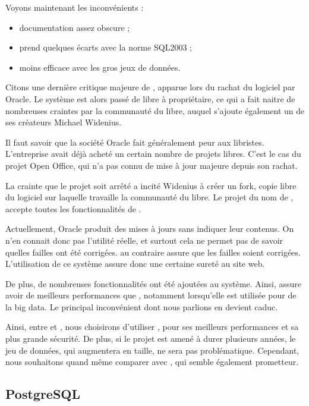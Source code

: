 Voyons maintenant les inconvénients :

\begin{itemize}
\item documentation assez obscure ;
\item prend quelques écarts avec la norme SQL2003 ;
\item moins efficace avec les gros jeux de données. 
\end{itemize} 

Citons une dernière critique majeure de \mysql, apparue lors du rachat du logiciel par Oracle. Le système est alors  passé de libre à propriétaire, ce qui  a fait naitre de nombreuses craintes par la communauté du libre, auquel s'ajoute également un de ses créateurs Michael Widenius. 

Il faut savoir que la société Oracle fait généralement peur aux libristes. L'entreprise avait déjà acheté un certain nombre de projets libres. C'est le cas du projet Open Office, qui n'a pas connu de mise à jour majeure depuis son rachat. 

La crainte que le projet soit arrêté a incité Widenius à créer un fork, copie libre du logiciel sur laquelle travaille la communauté du libre. Le projet du nom de \mdb, accepte toutes les fonctionnalités  de \mysql. 

Actuellement, Oracle produit des mises à jours sans indiquer leur contenus. On n'en connait donc pas l'utilité réelle, et surtout cela ne permet pas de savoir quelles failles ont été corrigées. \mdb au contraire assure que les failles soient corrigées. L'utilisation de ce système assure donc une certaine sureté au site web. 

De plus, de nombreuses fonctionnalités ont été ajoutées au système. Ainsi, \mdb assure avoir de meilleurs performances que \mysql, notamment lorsqu'elle est utilisée pour de la big data. Le principal inconvénient dont nous parlions en devient caduc. 

\medbreak

Ainsi, entre \mysql et \mdb, nous choisirons d'utiliser \mdb, pour ses meilleurs performances et sa plus grande sécurité. De plus, si le projet est amené à durer plusieurs années, le jeu de données, qui augmentera en taille, ne sera pas problématique. Cependant, nous souhaitons quand même comparer \mdb avec \psql, qui semble également prometteur. 


\subsection{PostgreSQL}

